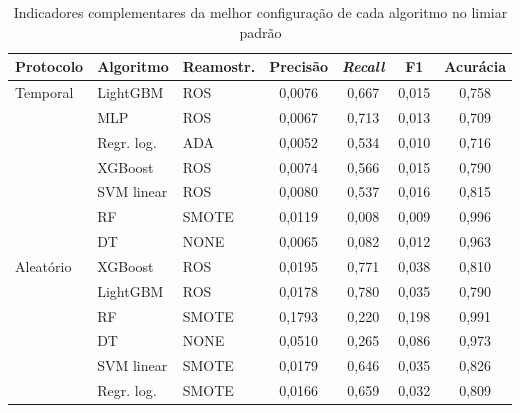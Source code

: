 \begin{table}[htbp]
    \centering
    \footnotesize
    \caption{Indicadores complementares da melhor configuração de cada algoritmo no limiar padrão}
    \label{tab:res-complementares}
    
    \begin{tabular}{lllcccc}
        \toprule
        Protocolo & Algoritmo & Reamostr. & Precisão & \textit{Recall} & F1 & Acurácia \\
        \midrule
        Temporal & LightGBM   & ROS   & 0,0076 & 0,667 & 0,015 & 0,758 \\
                 & MLP        & ROS   & 0,0067 & 0,713 & 0,013 & 0,709 \\
                 & Regr. log. & ADA   & 0,0052 & 0,534 & 0,010 & 0,716 \\
                 & XGBoost    & ROS   & 0,0074 & 0,566 & 0,015 & 0,790 \\
                 & SVM linear & ROS   & 0,0080 & 0,537 & 0,016 & 0,815 \\
                 & RF         & SMOTE & 0,0119 & 0,008 & 0,009 & 0,996 \\
                 & DT         & NONE  & 0,0065 & 0,082 & 0,012 & 0,963 \\
        \midrule
        Aleatório & XGBoost    & ROS   & 0,0195 & 0,771 & 0,038 & 0,810 \\
                  & LightGBM   & ROS   & 0,0178 & 0,780 & 0,035 & 0,790 \\
                  & RF         & SMOTE & 0,1793 & 0,220 & 0,198 & 0,991 \\
                  & DT         & NONE  & 0,0510 & 0,265 & 0,086 & 0,973 \\
                  & SVM linear & SMOTE & 0,0179 & 0,646 & 0,035 & 0,826 \\
                  & Regr. log. & SMOTE & 0,0166 & 0,659 & 0,032 & 0,809 \\
        \bottomrule
    \end{tabular}
\end{table}%
